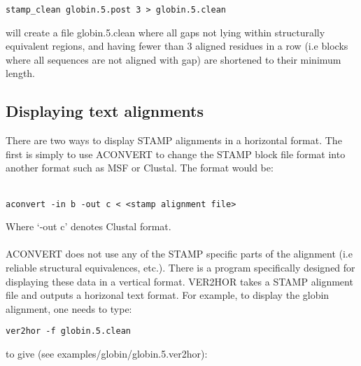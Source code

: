 \begin{scriptsize}\begin{verbatim}
stamp_clean globin.5.post 3 > globin.5.clean
\end{verbatim} \end{scriptsize}

will create a file globin.5.clean where all gaps not lying within 
structurally equivalent regions, and having fewer than 3 aligned residues 
in a row (i.e blocks where all sequences are not aligned with gap) are 
shortened to their minimum length.

\subsection{Displaying text alignments}

There are two ways to display STAMP alignments in a horizontal format.
The first is simply to use ACONVERT to change the STAMP block file format into
another format such as MSF or Clustal.  The format would be:\\
\\
\begin{scriptsize}\begin{verbatim}
aconvert -in b -out c < <stamp alignment file>
\end{verbatim} \end{scriptsize}

Where `-out c' denotes Clustal format.\\
\\
ACONVERT does not use any of the STAMP specific parts of the alignment (i.e reliable
structural equivalences, etc.).  There is a program specifically designed for displaying
these data in a vertical format.  VER2HOR takes a STAMP alignment file and outputs a 
horizonal text format.  For example, to display the globin alignment, one needs to
type:\\

\begin{scriptsize}\begin{verbatim}
ver2hor -f globin.5.clean 
\end{verbatim} \end{scriptsize}

to give (see examples/globin/globin.5.ver2hor):\\


